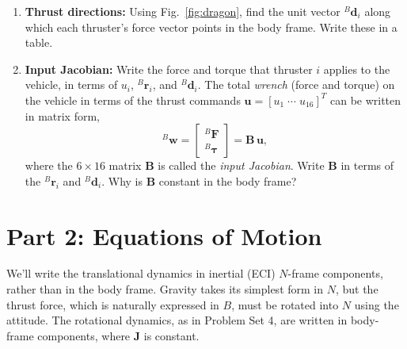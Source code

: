 \documentclass[11pt,letterpaper]{article}
\newcommand{\bJ}{\mathbf{J}}
\newcommand{\bu}{\mathbf{u}}
\newcommand{\bB}{\mathbf{B}}
\newcommand{\br}{\mathbf{r}}
\newcommand{\bd}{\mathbf{d}}
\newcommand{\bwr}{\mathbf{w}}
\newcommand{\BF}{{}^{B}\mathbf{F}}
\newcommand{\Btau}{{}^{B}\boldsymbol{\tau}}
\begin{document}
\begin{enumerate}[label=(\alph*)]
    \item \textbf{Thrust directions:} Using Fig.~\ref{fig:dragon}, find the unit vector ${}^{B}\bd_i$ along which each thruster's force vector points in the body frame. Write these in a table.

    \item \textbf{Input Jacobian:} Write the force and torque that thruster $i$ applies to the vehicle, in terms of $u_i$, ${}^{B}\br_i$, and ${}^{B}\bd_i$. The total \emph{wrench} (force and torque) on the vehicle in terms of the thrust commands $\bu = [u_1\;\cdots\;u_{16}]^T$ can be written in matrix form,
    \[
    {}^{B}\bwr = \begin{bmatrix} \BF \\ \Btau \end{bmatrix} = \bB\,\bu,
    \]
    where the $6\times16$ matrix $\bB$ is called the \emph{input Jacobian}. Write $\bB$ in terms of the ${}^{B}\br_i$ and ${}^{B}\bd_i$. Why is $\bB$ constant in the body frame?
\end{enumerate}

\section*{Part 2: Equations of Motion}

We'll write the translational dynamics in inertial (ECI) $N$-frame components, rather than in the body frame. Gravity takes its simplest form in $N$, but the thrust force, which is naturally expressed in $B$, must be rotated into $N$ using the attitude. The rotational dynamics, as in Problem Set 4, are written in body-frame components, where $\bJ$ is constant.
\end{document}
